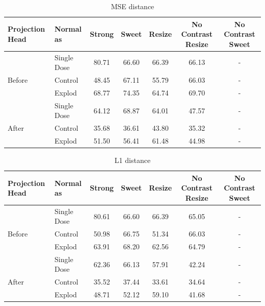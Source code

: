 \begin{table}[H]
  \centering
  \begin{tabular}{@{}llccccc@{}}
  \toprule
  Projection Head & Normal as       & Strong & Sweet & Resize & No Contrast Resize & No Contrast Sweet \\ \midrule
                  & Single Dose    & 80.71      & 66.60     & 66.39      & 66.13                  & -                 \\
  Before          & Control        & 48.45      & 67.11     & 55.79      & 66.03                  & -                 \\
                  & Explod         & 68.77      & 74.35    & 64.74      & 69.70                  & -                 \\ \midrule
                  & Single Dose    & 64.12      & 68.87     & 64.01      & 47.57                  & -                 \\
  After           & Control        & 35.68      & 36.61     & 43.80      & 35.32                  & -                 \\
                  & Explod         & 51.50      & 56.41     & 61.48      & 44.98                  & -                 \\ \bottomrule
  \end{tabular}
  \caption{MSE distance}
  \label{tab:table_label}
\end{table}

\begin{table}[H]
  \centering
  \begin{tabular}{@{}llccccc@{}}
  \toprule
  Projection Head & Normal as       & Strong & Sweet & Resize & No Contrast Resize & No Contrast Sweet \\ \midrule
                  & Single Dose    & 80.61      & 66.60     & 66.39      & 65.05                  & -                 \\
  Before          & Control        & 50.98      & 66.75     &  51.34     & 66.03                  & -                 \\
                  & Explod         & 63.91      & 68.20     & 62.56      & 64.79                  & -                 \\ \midrule
                  & Single Dose    & 62.36      & 66.13     & 57.91      & 42.24                  & -                 \\
  After           & Control        & 35.52      & 37.44     & 33.61      & 34.64                  & -                 \\
                  & Explod         & 48.71      & 52.12     & 59.10      & 41.68                  & -                 \\ \bottomrule
  \end{tabular}
  \caption{L1 distance}
  \label{tab:table_label}
\end{table}

